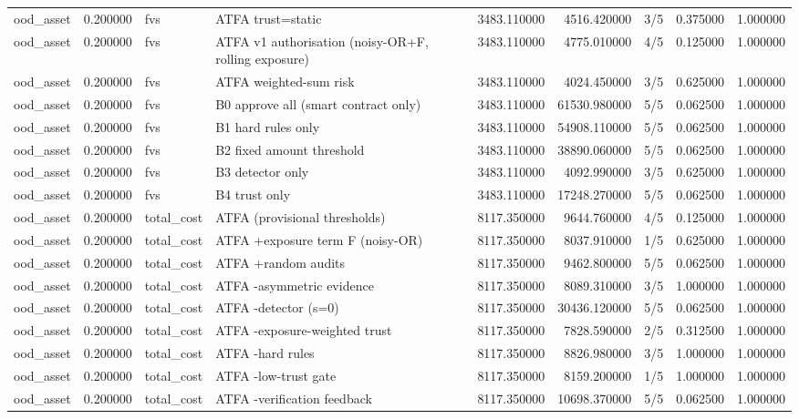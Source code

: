 \begin{tabular}{lrllrrlrr}
ood\_asset & 0.200000 & fvs & ATFA trust=static & 3483.110000 & 4516.420000 & 3/5 & 0.375000 & 1.000000 \\
ood\_asset & 0.200000 & fvs & ATFA v1 authorisation (noisy-OR+F, rolling exposure) & 3483.110000 & 4775.010000 & 4/5 & 0.125000 & 1.000000 \\
ood\_asset & 0.200000 & fvs & ATFA weighted-sum risk & 3483.110000 & 4024.450000 & 3/5 & 0.625000 & 1.000000 \\
ood\_asset & 0.200000 & fvs & B0 approve all (smart contract only) & 3483.110000 & 61530.980000 & 5/5 & 0.062500 & 1.000000 \\
ood\_asset & 0.200000 & fvs & B1 hard rules only & 3483.110000 & 54908.110000 & 5/5 & 0.062500 & 1.000000 \\
ood\_asset & 0.200000 & fvs & B2 fixed amount threshold & 3483.110000 & 38890.060000 & 5/5 & 0.062500 & 1.000000 \\
ood\_asset & 0.200000 & fvs & B3 detector only & 3483.110000 & 4092.990000 & 3/5 & 0.625000 & 1.000000 \\
ood\_asset & 0.200000 & fvs & B4 trust only & 3483.110000 & 17248.270000 & 5/5 & 0.062500 & 1.000000 \\
ood\_asset & 0.200000 & total\_cost & ATFA (provisional thresholds) & 8117.350000 & 9644.760000 & 4/5 & 0.125000 & 1.000000 \\
ood\_asset & 0.200000 & total\_cost & ATFA +exposure term F (noisy-OR) & 8117.350000 & 8037.910000 & 1/5 & 0.625000 & 1.000000 \\
ood\_asset & 0.200000 & total\_cost & ATFA +random audits & 8117.350000 & 9462.800000 & 5/5 & 0.062500 & 1.000000 \\
ood\_asset & 0.200000 & total\_cost & ATFA -asymmetric evidence & 8117.350000 & 8089.310000 & 3/5 & 1.000000 & 1.000000 \\
ood\_asset & 0.200000 & total\_cost & ATFA -detector (s=0) & 8117.350000 & 30436.120000 & 5/5 & 0.062500 & 1.000000 \\
ood\_asset & 0.200000 & total\_cost & ATFA -exposure-weighted trust & 8117.350000 & 7828.590000 & 2/5 & 0.312500 & 1.000000 \\
ood\_asset & 0.200000 & total\_cost & ATFA -hard rules & 8117.350000 & 8826.980000 & 3/5 & 1.000000 & 1.000000 \\
ood\_asset & 0.200000 & total\_cost & ATFA -low-trust gate & 8117.350000 & 8159.200000 & 1/5 & 1.000000 & 1.000000 \\
ood\_asset & 0.200000 & total\_cost & ATFA -verification feedback & 8117.350000 & 10698.370000 & 5/5 & 0.062500 & 1.000000 \\

\end{tabular}
